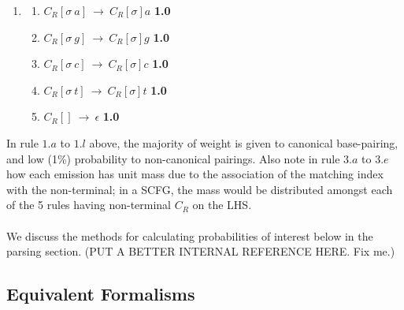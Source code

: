 \documentclass[11pt]{article}
\begin{document}
\begin{enumerate}
\begin{enumerate}
  \end{enumerate}
\item
  \begin{enumerate}
    \item $C_R[\sigma \ a] \ \rightarrow \ C_R[\sigma] a$ {\bf 1.0}
    \item $C_R[\sigma \ g] \ \rightarrow \ C_R[\sigma] g$ {\bf 1.0}
    \item $C_R[\sigma \ c] \ \rightarrow \ C_R[\sigma] c$ {\bf 1.0}
    \item $C_R[\sigma \ t] \ \rightarrow \ C_R[\sigma] t$ {\bf 1.0}
    \item $C_R[] \ \rightarrow \ \epsilon$ {\bf 1.0}
  \end{enumerate}
\end{enumerate}
In rule $1.a$ to $1.l$ above, the majority of weight is given to canonical base-pairing, and low (1\%) probability to non-canonical pairings.
Also note in rule $3.a$ to $3.e$ how each emission has unit mass due to the association of the matching index with the non-terminal; in a SCFG,
the mass would be distributed amongst each of the 5 rules having non-terminal $C_R$ on the LHS.\\ \\
We discuss the methods for calculating probabilities of interest below in the parsing section. (PUT A BETTER INTERNAL REFERENCE HERE. Fix me.) \\

\subsection {Equivalent Formalisms}
\end{document}
